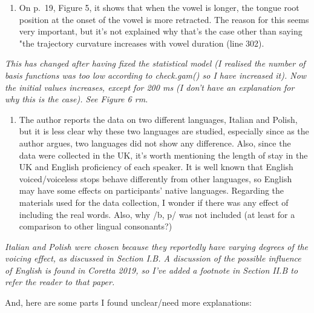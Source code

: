 \documentclass[]{article}
\providecommand{\tightlist}{%
  \setlength{\itemsep}{0pt}\setlength{\parskip}{0pt}}
\begin{document}
\begin{enumerate}
\def\labelenumi{\arabic{enumi}.}
\setcounter{enumi}{2}
\tightlist
\item
  On p.~19, Figure 5, it shows that when the vowel is longer, the tongue
  root position at the onset of the vowel is more retracted. The reason
  for this seems very important, but it's not explained why that's the
  case other than saying "the trajectory curvature increases with vowel
  duration (line 302).
\end{enumerate}

\begin{adjustwidth}{1cm}{} \textit{
This has changed after having fixed the statistical model (I realised the number of basis functions was too low according to check.gam() so I have increased it). Now the initial values increases, except for 200 ms (I don't have an explanation for why this is the case). See Figure 6 rm.
} \end{adjustwidth}

\begin{enumerate}
\def\labelenumi{\arabic{enumi}.}
\setcounter{enumi}{3}
\tightlist
\item
  The author reports the data on two different languages, Italian and
  Polish, but it is less clear why these two languages are studied,
  especially since as the author argues, two languages did not show any
  difference. Also, since the data were collected in the UK, it's worth
  mentioning the length of stay in the UK and English proficiency of
  each speaker. It is well known that English voiced/voiceless stops
  behave differently from other languages, so English may have some
  effects on participants' native languages. Regarding the materials
  used for the data collection, I wonder if there was any effect of
  including the real words. Also, why /b, p/ was not included (at least
  for a comparison to other lingual consonants?)
\end{enumerate}

\begin{adjustwidth}{1cm}{} \textit{
Italian and Polish were chosen because they reportedly have varying degrees of the voicing effect, as discussed in Section I.B.
A discussion of the possible influence of English is found in Coretta 2019, so I've added a footnote in Section II.B to refer the reader to that paper.
} \end{adjustwidth}

And, here are some parts I found unclear/need more explanations:
\end{document}
